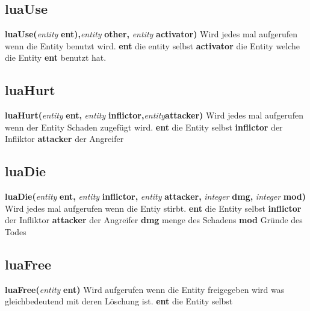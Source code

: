 \documentclass[11pt,a4paper]{book}
\begin{document}
\subsection{luaUse}
\label{luaUse}
\textbf{luaUse(}\textit{entity}\textbf{ ent),}\textit{entity} \textbf{other,} \textit{entity} \textbf{activator)}
\newline
Wird jedes mal aufgerufen wenn die Entity benutzt wird.
\newline
\textbf{ent} die entity selbst
\newline
\textbf{activator} die Entity welche die Entity \textbf{ent} benutzt hat.
\subsection{luaHurt}
\label{luaHurt}
\textbf{luaHurt(}\textit{entity}\textbf{ ent, }\textit{entity}\textbf{ inflictor,}\textit{entity}\textbf{attacker)}
\newline
Wird jedes mal aufgerufen wenn der Entity Schaden zugefügt wird.
\newline
\textbf{ent} die Entity selbst
\newline
\textbf{inflictor} der Infliktor
\newline
\textbf{attacker} der Angreifer
\subsection{luaDie}
\label{luaDie}
\textbf{luaDie(}\textit{entity} \textbf{ent,} \textit{entity} \textbf{inflictor,} \textit{entity} \textbf{attacker,} \textit{integer} \textbf{dmg,} \textit{integer}\textbf{ mod)}
\newline
Wird jedes mal aufgerufen wenn die Entiy stirbt.
\newline
\textbf{ent} die Entity selbst
\newline
\textbf{inflictor} der Infliktor
\newline
\textbf{attacker} der Angreifer
\newline
\textbf{dmg} menge des Schadens
\newline
\textbf{mod} Gründe des Todes
\subsection{luaFree}
\label{luaFree}
\textbf{luaFree(}\textit{entity} \textbf{ent)}
\newline
Wird aufgerufen wenn die Entity freigegeben wird was gleichbedeutend mit deren Löschung ist.
\newline
\textbf{ent} die Entity selbst
\end{document}
